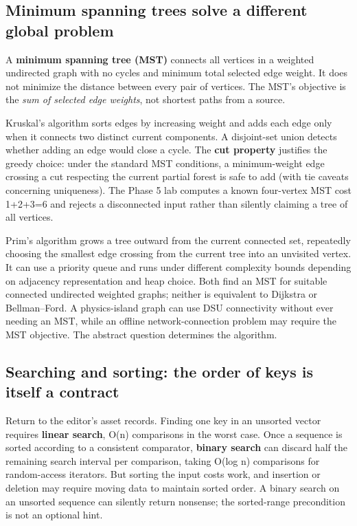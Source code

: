 \subsection{Minimum spanning trees solve a different global problem}\label{01-foundations-i-ch008-minimum-spanning-trees-solve-a-different-global-problem}

A \textbf{minimum spanning tree (MST)} connects all vertices in a weighted undirected graph with no cycles and minimum total selected edge weight. It does not minimize the distance between every pair of vertices. The MST's objective is the \emph{sum of selected edge weights}, not shortest paths from a source.

Kruskal's algorithm sorts edges by increasing weight and adds each edge only when it connects two distinct current components. A disjoint-set union detects whether adding an edge would close a cycle. The \textbf{cut property} justifies the greedy choice: under the standard MST conditions, a minimum-weight edge crossing a cut respecting the current partial forest is safe to add (with tie caveats concerning uniqueness). The Phase 5 lab computes a known four-vertex MST cost 1+2+3=6 and rejects a disconnected input rather than silently claiming a tree of all vertices.

Prim's algorithm grows a tree outward from the current connected set, repeatedly choosing the smallest edge crossing from the current tree into an unvisited vertex. It can use a priority queue and runs under different complexity bounds depending on adjacency representation and heap choice. Both find an MST for suitable connected undirected weighted graphs; neither is equivalent to Dijkstra or Bellman--Ford. A physics-island graph can use DSU connectivity without ever needing an MST, while an offline network-connection problem may require the MST objective. The abstract question determines the algorithm.

\subsection{Searching and sorting: the order of keys is itself a contract}\label{01-foundations-i-ch008-searching-and-sorting-the-order-of-keys-is-itself-a-contract}

Return to the editor's asset records. Finding one key in an unsorted vector requires \textbf{linear search}, O(n) comparisons in the worst case. Once a sequence is sorted according to a consistent comparator, \textbf{binary search} can discard half the remaining search interval per comparison, taking O(log n) comparisons for random-access iterators. But sorting the input costs work, and insertion or deletion may require moving data to maintain sorted order. A binary search on an unsorted sequence can silently return nonsense; the sorted-range precondition is not an optional hint.

